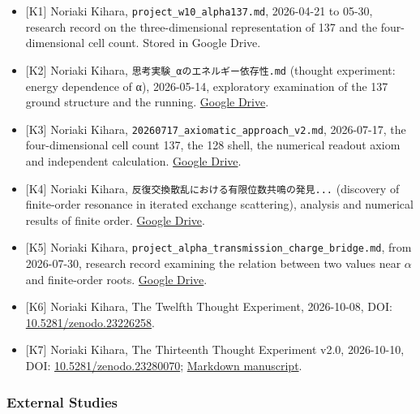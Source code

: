 \documentclass[
  a4paper,
]{article}
\providecommand{\tightlist}{%
  \setlength{\itemsep}{0pt}\setlength{\parskip}{0pt}}
\begin{document}
\begin{itemize}
\tightlist
\item
  {[}K1{]} Noriaki Kihara, \texttt{project\_\allowbreak{}w10\_\allowbreak{}alpha137.md},
  2026-04-21 to 05-30, research record on the three-dimensional
  representation of 137 and the four-dimensional cell count. Stored in
  Google Drive.
\item
  {[}K2{]} Noriaki Kihara, \texttt{思考実験\_\allowbreak{}αのエネルギー依存性.md}
  (thought experiment: energy dependence of α), 2026-05-14, exploratory
  examination of the 137 ground structure and the running.
  \href{https://drive.google.com/file/d/1yhH5Wk-Qi2IojaEgZLc_P2V2Z9Cng1nH/view}{Google
  Drive}.
\item
  {[}K3{]} Noriaki Kihara,
  \texttt{20260717\_\allowbreak{}axiomatic\_\allowbreak{}approach\_\allowbreak{}v2.md}, 2026-07-17, the
  four-dimensional cell count 137, the 128 shell, the numerical readout
  axiom and independent calculation.
  \href{https://drive.google.com/file/d/1FGNsJHZqMyTWUm6pwqWxDbpfq3BvZa6T/view}{Google
  Drive}.
\item
  {[}K4{]} Noriaki Kihara,
  \texttt{反復交換散乱における有限位数共鳴の発見...} (discovery of
  finite-order resonance in iterated exchange scattering), analysis and
  numerical results of finite order.
  \href{https://drive.google.com/file/d/1F19s-4mlGYB93IkSYrNtS9CUfGvaOFs3/view}{Google
  Drive}.
\item
  {[}K5{]} Noriaki Kihara,
  \texttt{project\_\allowbreak{}alpha\_\allowbreak{}transmission\_\allowbreak{}charge\_\allowbreak{}bridge.md}, from
  2026-07-30, research record examining the relation between two values
  near \(\alpha\) and finite-order roots.
  \href{https://drive.google.com/file/d/1F2RUrAS7Aj6xTwU9MbVm-JfqW5dgK6yo/view}{Google
  Drive}.
\item
  {[}K6{]} Noriaki Kihara, The Twelfth Thought Experiment, 2026-10-08,
  DOI:
  \href{https://doi.org/10.5281/zenodo.23226258}{10.5281/zenodo.23226258}.
\item
  {[}K7{]} Noriaki Kihara, The Thirteenth Thought Experiment v2.0,
  2026-10-10, DOI:
  \href{https://doi.org/10.5281/zenodo.23280070}{10.5281/zenodo.23280070};
  \href{https://drive.google.com/file/d/10SJBaaaI7OktbwF6-0Q_PYHR8v_XcJr8/view}{Markdown
  manuscript}.
\end{itemize}

\subsubsection{External Studies}\label{external-studies}
\end{document}
